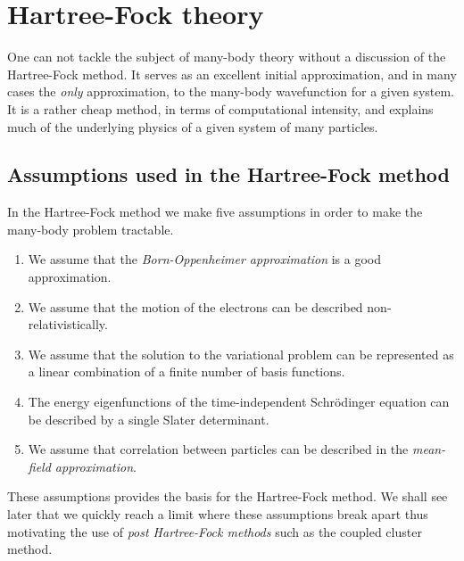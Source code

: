 \chapter{Hartree-Fock theory}
    One can not tackle the subject of many-body theory without a discussion of
    the Hartree-Fock method. It serves as an excellent initial approximation,
    and in many cases the \emph{only} approximation, to the many-body
    wavefunction for a given system. It is a rather cheap method, in terms of
    computational intensity, and explains much of the underlying physics of a
    given system of many particles.

    \section{Assumptions used in the Hartree-Fock method}
        In the Hartree-Fock method we make five assumptions in order to make the
        many-body problem tractable.
        \begin{enumerate}
            \item We assume that the \emph{Born-Oppenheimer approximation} is a
                good approximation.
            \item We assume that the motion of the electrons can be described
                non-relativistically.
            \item We assume that the solution to the variational problem can be
                represented as a linear combination of a finite number of basis
                functions.
            \item The energy eigenfunctions of the time-independent Schrödinger
                equation can be described by a single Slater determinant.
            \item We assume that correlation between particles can be described
                in the \emph{mean-field approximation}.
        \end{enumerate}
        These assumptions provides the basis for the Hartree-Fock method. We
        shall see later that we quickly reach a limit where these assumptions
        break apart thus motivating the use of \emph{post Hartree-Fock methods}
        such as the coupled cluster method.

